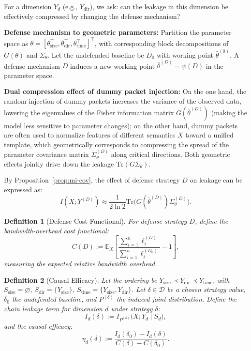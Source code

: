 \documentclass[lettersize,journal]{IEEEtran}
\newtheorem{definition}{Definition}
\newcommand{\E}{\mathbb{E}}
\begin{document}
For a dimension $Y_d$ (e.g., $Y_{\mathrm{dir}}$), we ask: can the leakage
in this dimension be effectively compressed by changing the defense
mechanism?

\textbf{Defense mechanism to geometric parameters:}
Partition the parameter space as
$\theta = [\theta_{\mathrm{size}}^\top, \theta_{\mathrm{dir}}^\top, \theta_{\mathrm{time}}^\top]^\top$,
with corresponding block decompositions of $G(\theta)$ and $\Sigma_\theta$.
Let the undefended baseline be $D_0$ with working point $\bar\theta^{(0)}$.
A defense mechanism $D$ induces a new working point
$\bar\theta^{(D)} = \psi(D)$ in the parameter space.

\textbf{Dual compression effect of dummy packet injection:}
On the one hand, the random injection of dummy packets increases the
variance of the observed data, lowering the eigenvalues of the Fisher
information matrix $G(\bar\theta^{(D)})$ (making the model less sensitive
to parameter changes); on the other hand, dummy packets are often used to
normalize features of different semantics $X$ toward a unified template,
which geometrically corresponds to compressing the spread of the parameter
covariance matrix $\Sigma_\theta^{(D)}$ along critical directions.
Both geometric effects jointly drive down the leakage
$\mathrm{Tr}(G\Sigma_\theta)$.

By Proposition~\ref{prop:mi-cov}, the effect of defense strategy $D$ on
leakage can be expressed as:
\begin{equation}\label{eq:defense-mi}
I(X;Y^{(D)}) \approx \frac{1}{2\ln 2}\mathrm{Tr}\!\big(G(\bar\theta^{(D)})\Sigma_\theta^{(D)}\big).
\end{equation}

\begin{definition}[Defense Cost Functional]\label{def:cost}
For defense strategy $D$, define the bandwidth-overhead cost functional:
\[
C(D) := \E_{X}\left[\frac{\sum_{i=1}^{n} \ell_i^{(D)}}{\sum_{i=1}^{n} \ell_i^{(D_0)}} - 1\right],
\]
measuring the expected relative bandwidth overhead.
\end{definition}

\begin{definition}[Causal Efficacy]\label{def:causal-efficacy}
Let the ordering be
$Y_{\mathrm{size}}\prec Y_{\mathrm{dir}}\prec Y_{\mathrm{time}}$,
with $S_{\mathrm{size}}=\varnothing$,
$S_{\mathrm{dir}}=\{Y_{\mathrm{size}}\}$,
$S_{\mathrm{time}}=\{Y_{\mathrm{size}},Y_{\mathrm{dir}}\}$.
Let $\delta\in\mathcal{D}$ be a chosen strategy value, $\delta_0$ the
undefended baseline, and $P^{(\delta)}$ the induced joint distribution.
Define the chain leakage term for dimension $d$ under strategy $\delta$:
\[
I_d(\delta):=I_{P^{(\delta)}}\!\big(X;Y_d \mid S_d\big),
\]
and the causal efficacy:
\[
\eta_d(\delta):=\frac{I_d(\delta_0)-I_d(\delta)}{C(\delta)-C(\delta_0)}.
\]
\end{definition}
\end{document}
